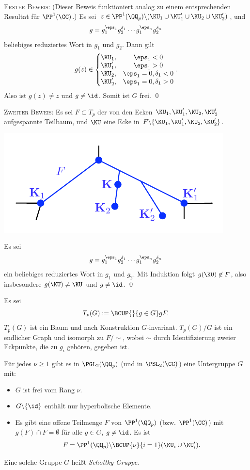 \textsc{Erster Beweis:}
(Dieser Beweis funktioniert analog zu einem entsprechenden
Resultat für $\PP^1(\CC)$.)
Es sei
$z\in\PP^1(\QQ_p)\backslash(\KU_1\cup\KU_1'\cup\KU_2\cup\KU_2')$,
und
\[
g = g_1^{\eps_1} g_2^{\delta_1} \cdots g_1^{\eps_n} g_2^{\delta_n}
\]
beliebiges reduziertes Wort in $g_1$ und $g_2$.
Dann gilt
\[
g(z) \in
\left\{
\begin{matrix}
\KU_1, & \eps_1<0 \\
\KU_1', &\eps_1>0 \\
\KU_2, &\eps_1=0,\delta_1<0\\
\KU_2', &\eps_1=0,\delta_1>0
\end{matrix}
\right..
\]
Also ist $g(z)\neq z$ und $g\neq\id$. Somit ist $G$ frei.
\qed

\textsc{Zweiter Beweis:} Es sei $F\subset T_p$ der von den Ecken
$\KU_1,\KU_1',\KU_2,\KU_2'$ aufgespannte Teilbaum, und
$\KU$ eine Ecke in $F\backslash\{\KU_1,\KU_1',\KU_2,\KU_2'\}$.
\begin{center}
	\includegraphics{grugraImages/ihara2}
\end{center}
Es sei
\[
g = g_1^{\eps_1} g_2^{\delta_1} \cdots g_1^{\eps_n} g_2^{\delta_n}
\]
ein beliebiges reduziertes Wort in $g_1$ und $g_2$.
Mit Induktion folgt $g(\KU)\not\in F$, also insbesondere
$g(\KU)\neq\KU$ und $g\neq \id$.
\qed

\BEM Es sei
\[
T_p(G):=\BCUP{}{g\in G} g F.
\]
$T_p(G)$ ist ein Baum und nach Konstruktion $G$-invariant.
$T_p(G)/G$ ist ein endlicher Graph und isomorph zu $F/\sim$, wobei
$\sim$ durch Identifizierung zweier Eckpunkte, die zu $g_i$ gehören,
gegeben ist.

\BEM Für jedes $\nu\geq 1$ gibt es in $\PGL_2(\QQ_p)$ (und in
$\PSL_2(\CC)$) eine Untergruppe $G$ mit:
\begin{itemize}
\item $G$ ist frei vom Rang $\nu$.
\item $G\backslash\{\id\}$ enthält nur hyperbolische Elemente.
\item Es gibt eine offene Teilmenge $F$ von $\PP^1(\QQ_p)$ (bzw.
$\PP^1(\CC)$) mit $g(F)\cap F=\emptyset$ für alle $g\in G$,
$g\neq\id$. Es ist
\[
F=\PP^1(\QQ_p)\backslash\BCUP{\nu}{i=1}(\KU_i\cup\KU_i').
\]
\end{itemize}
Eine solche Gruppe $G$ heißt \emph{Schottky-Gruppe}.